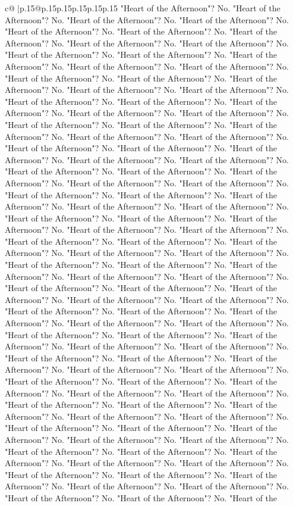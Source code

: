 \documentclass{article}
\begin{document}
{\begin{supertabular}{c@{$\;$}|p{.15\linewidth}@{}p{.15\linewidth}p{.15\linewidth}p{.15\linewidth}p{.15\linewidth}p{.15\linewidth}}
{{{"Heart of the Afternoon"? No. "Heart of the Afternoon"? No. "Heart of the Afternoon"? No. "Heart of the Afternoon"? No. "Heart of the Afternoon"? No. "Heart of the Afternoon"? No. "Heart of the Afternoon"? No. "Heart of the Afternoon"? No. "Heart of the Afternoon"? No. "Heart of the Afternoon"? No. "Heart of the Afternoon"? No. "Heart of the Afternoon"? No. "Heart of the Afternoon"? No. "Heart of the Afternoon"? No. "Heart of the Afternoon"? No. "Heart of the Afternoon"? No. "Heart of the Afternoon"? No. "Heart of the Afternoon"? No. "Heart of the Afternoon"? No. "Heart of the Afternoon"? No. "Heart of the Afternoon"? No. "Heart of the Afternoon"? No. "Heart of the Afternoon"? No. "Heart of the Afternoon"? No. "Heart of the Afternoon"? No. "Heart of the Afternoon"? No. "Heart of the Afternoon"? No. "Heart of the Afternoon"? No. "Heart of the Afternoon"? No. "Heart of the Afternoon"? No. "Heart of the Afternoon"? No. "Heart of the Afternoon"? No. "Heart of the Afternoon"? No. "Heart of the Afternoon"? No. "Heart of the Afternoon"? No. "Heart of the Afternoon"? No. "Heart of the Afternoon"? No. "Heart of the Afternoon"? No. "Heart of the Afternoon"? No. "Heart of the Afternoon"? No. "Heart of the Afternoon"? No. "Heart of the Afternoon"? No. "Heart of the Afternoon"? No. "Heart of the Afternoon"? No. "Heart of the Afternoon"? No. "Heart of the Afternoon"? No. "Heart of the Afternoon"? No. "Heart of the Afternoon"? No. "Heart of the Afternoon"? No. "Heart of the Afternoon"? No. "Heart of the Afternoon"? No. "Heart of the Afternoon"? No. "Heart of the Afternoon"? No. "Heart of the Afternoon"? No. "Heart of the Afternoon"? No. "Heart of the Afternoon"? No. "Heart of the Afternoon"? No. "Heart of the Afternoon"? No. "Heart of the Afternoon"? No. "Heart of the Afternoon"? No. "Heart of the Afternoon"? No. "Heart of the Afternoon"? No. "Heart of the Afternoon"? No. "Heart of the Afternoon"? No. "Heart of the Afternoon"? No. "Heart of the Afternoon"? No. "Heart of the Afternoon"? No. "Heart of the Afternoon"? No. "Heart of the Afternoon"? No. "Heart of the Afternoon"? No. "Heart of the Afternoon"? No. "Heart of the Afternoon"? No. "Heart of the Afternoon"? No. "Heart of the Afternoon"? No. "Heart of the Afternoon"? No. "Heart of the Afternoon"? No. "Heart of the Afternoon"? No. "Heart of the Afternoon"? No. "Heart of the Afternoon"? No. "Heart of the Afternoon"? No. "Heart of the Afternoon"? No. "Heart of the Afternoon"? No. "Heart of the Afternoon"? No. "Heart of the Afternoon"? No. "Heart of the Afternoon"? No. "Heart of the Afternoon"? No. "Heart of the Afternoon"? No. "Heart of the Afternoon"? No. "Heart of the Afternoon"? No. "Heart of the Afternoon"? No. "Heart of the Afternoon"? No. "Heart of the Afternoon"? No. "Heart of the Afternoon"? No. "Heart of the Afternoon"? No. "Heart of the Afternoon"? No. "Heart of the Afternoon"? No. "Heart of the Afternoon"? No. "Heart of the Afternoon"? No. "Heart of the Afternoon"? No. "Heart of the Afternoon"? No. "Heart of the Afternoon"? No. "Heart of the Afternoon"? No. "Heart of the Afternoon"? No. "Heart of the Afternoon"? No. "Heart of the Afternoon"? No. "Heart of the Afternoon"? No. "Heart of the }}}
\end{supertabular}}
\end{document}
